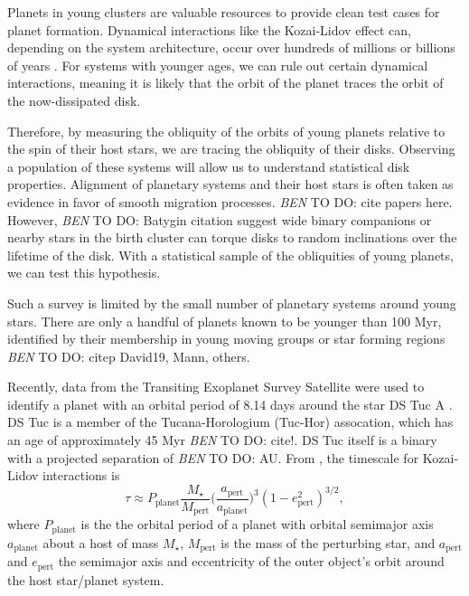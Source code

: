 \documentclass[twocolumn]{aastex62}
\newcommand{\todo}[3]{{\color{#2} \emph{#1} TO DO: #3}}
\newcommand{\btmtodo}[1]{\todo{BEN}{blue}{#1}}
\begin{document}
Planets in young clusters are valuable resources to provide clean test cases for planet formation. 
Dynamical interactions like the Kozai-Lidov effect can, depending on the system architecture, occur over hundreds of millions or billions of years \citep{Montet15c, Naoz16}. 
For systems with younger ages, we can rule out certain dynamical interactions, meaning it is likely that the orbit of the planet traces the orbit of the now-dissipated disk. 

Therefore, by measuring the obliquity of the orbits of young planets relative to the spin of their host stars, we are tracing the obliquity of their disks. 
Observing a population of these systems will allow us to understand statistical disk properties. 
Alignment of planetary systems and their host stars is often taken as evidence in favor of smooth migration processes. \btmtodo{cite papers here}. 
However, \btmtodo{Batygin citation} suggest wide binary companions or nearby stars in the birth cluster can torque disks to random inclinations over the lifetime of the disk. With a statistical sample of the obliquities of young planets, we can test this hypothesis.

Such a survey is limited by the small number of planetary systems around young stars. There are only a handful of planets known to be younger than 100 Myr, identified by their membership in young moving groups or star forming regions \btmtodo{citep David19, Mann, others}.

Recently, data from the Transiting Exoplanet Survey Satellite \citep{Ricker14} were used to identify a planet with an orbital period of 8.14 days around the star DS Tuc A \citep{Benatti19, Newton19}. 
DS Tuc is a member of the Tucana-Horologium (Tuc-Hor) assocation, which has an age of approximately 45 Myr \btmtodo{cite!}. 
DS Tuc itself is a binary with a projected separation of \btmtodo{AU}. 
From \citet{Holman97}, the timescale for Kozai-Lidov interactions is
\begin{equation}
    \tau \approx P_\textrm{planet} \frac{M_\star}{M_\textrm{pert}} \bigg(\frac{a_\textrm{pert}}{a_\textrm{planet}}\bigg)^3 (1-e^2_\textrm{pert})^{3/2},
\label{eq:timescale}
\end{equation}
where $P_\textrm{planet}$ is the the orbital period of a planet with orbital semimajor axis  $a_\textrm{planet}$ about a host of mass $M_\star$, $M_\textrm{pert}$ is the
mass of the perturbing star, and $a_\textrm{pert}$ and $e_\textrm{pert}$ the semimajor axis and eccentricity of the outer object's orbit around the host star/planet system.
\end{document}
